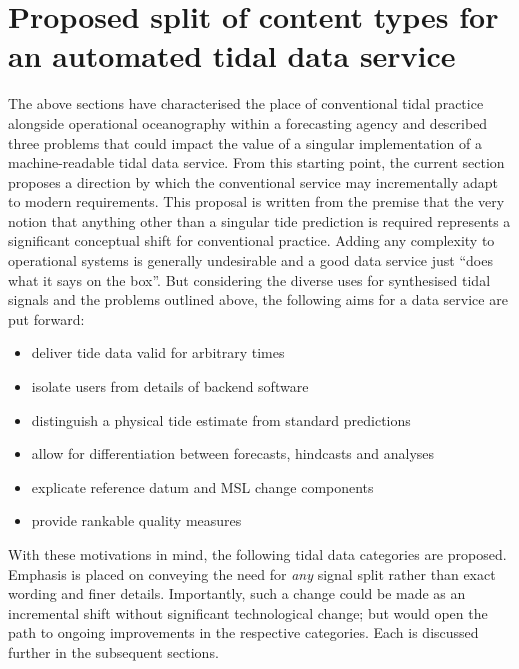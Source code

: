 \section{Proposed split of content types for an automated tidal data service}
\label{Sec:proposed}
The above sections have characterised the place of conventional tidal practice alongside operational oceanography within a forecasting agency and described three problems that could impact the value of a singular implementation of a machine-readable tidal data service.   From this starting point, the current section proposes a direction by which the conventional service may incrementally adapt to modern requirements.  This proposal is written from the premise that the very notion that anything other than a singular tide prediction is required represents a significant conceptual shift for conventional practice.
Adding any complexity to operational systems is generally undesirable and a good data service just ``does what it says on the box''.  But considering the diverse uses for synthesised tidal signals and the problems outlined above, the following aims for a data service are put forward: 
\begin{itemize}
    \item deliver tide data valid for arbitrary times
    \item isolate users from details of backend software 
    \item distinguish a physical tide estimate from standard predictions
    \item allow for differentiation between forecasts, hindcasts and analyses
    \item explicate reference datum and MSL change components
    \item provide rankable quality measures
\end{itemize}

With these motivations in mind, the following tidal data categories are proposed.   Emphasis is placed on conveying the need for \textit{any} signal split rather than exact wording and finer details.  Importantly, such a change could be made as an incremental shift without significant technological change; but would open the path to ongoing improvements in the respective categories. 
Each is discussed further in the subsequent sections.

